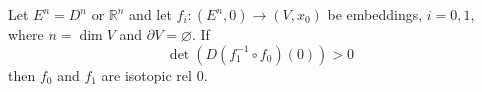 Let $E^n = D^n$ or $\mathbb{R}^n$ and let $f_i: (E^n, 0) \rightarrow (V, x_0)$ be embeddings, $i = 0, 1$, where $n = \dim V$ and $\partial V = \varnothing$. If
$$\det(D(f_1^{-1} \circ f_0)(0)) > 0$$
then $f_0$ and $f_1$ are isotopic rel $0$.
